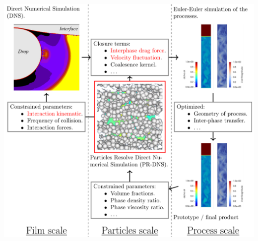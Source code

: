 \documentclass{sintefbeamer}
\begin{document}
\begin{frame}

    \centering
    \includegraphics[height=1.1\textheight]{image/diagram_strategy.png}
  

\end{frame}
\end{document}
